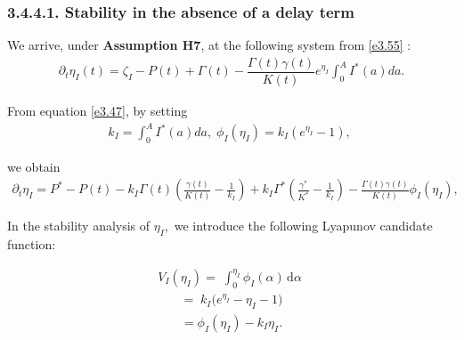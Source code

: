 \documentclass[10pt, a4paper]{amsart}
\theoremstyle{plain}
\theoremstyle{definition}
\theoremstyle{remark}
\numberwithin{equation}{section}
\begin{document}
 \subsubsection*{\bf 3.4.4.1. Stability in the absence of a delay term}\label{s341}
We arrive, under {\bf Assumption H7}, at the following system from \eqref{e3.55} :
\begin{align}\label{e3.69}
   \partial_t\eta_I(t)=\zeta_I-P(t)+\Gamma(t)-\dfrac{\Gamma(t)\gamma(t)}{K(t)}e^{\eta_I}\displaystyle\int_{0}^A I^*(a)da.
\end{align}

From equation \eqref{e3.47}, by setting 
\begin{align}\label{e3.70}
    k_I=\displaystyle\int_{0}^A I^*(a)da,\;\phi_I(\eta_I)=k_I(e^{\eta_I}-1),\; %
\end{align}

we obtain
\begin{align}\label{e3.71}
  \partial_t\eta_I=P^*-P(t)-k_I\Gamma(t)(\frac{\gamma(t)}{K(t)}-\frac{1}{k_I})+k_I\Gamma^*(\frac{\gamma^*}{K^*}-\frac{1}{k_I})-\frac{\Gamma(t)\gamma(t)}{K(t)}\phi_I(\eta_I),
\end{align}

In the stability analysis of $\eta_I,$ we introduce the following Lyapunov candidate function:

 \begin{align}\label{e3.72}
     V_{I}(\eta_{I})=\;\int_{0}^{\eta_{I}}\phi_{I}(\alpha)\,\mathrm{d}\alpha
 \;
 \end{align}
 \begin{align*}
     =\;k_I\bigl(e^{\eta_{I}}-\eta_{I}-1\bigr)
 \end{align*}
 \begin{align*}
     =\phi_I(\eta_I)-k_I\eta_I.
 \end{align*}
 
\end{document}
